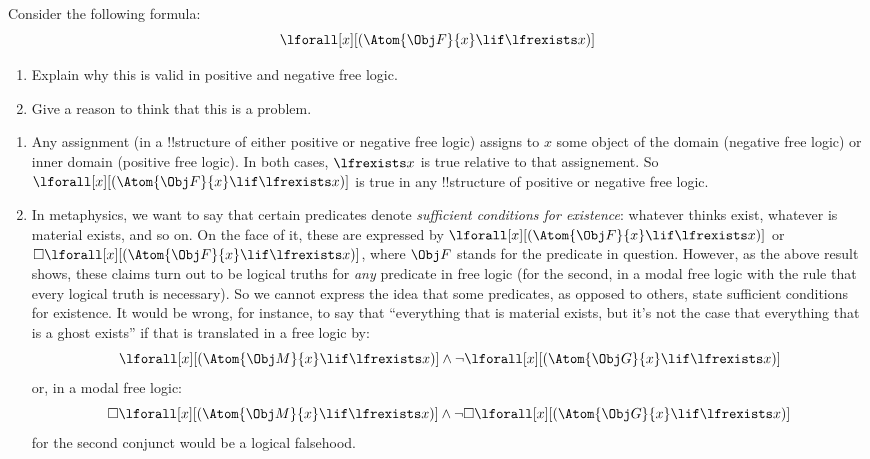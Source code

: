 \documentclass[../../../include/open-logic-section]{subfiles}
\begin{document}
\begin{prob}
Consider the following formula:
$$\lforall[x][(\Atom{\Obj F}{x} \lif \lfrexists x)]$$
\begin{enumerate}
	\item Explain why this is valid in positive and negative free logic.
	\item Give a reason to think that this is a problem.
\end{enumerate}
\begin{ans}
\begin{enumerate}
\item Any assignment (in a !!{structure} of either positive or
	negative free logic) assigns to $x$ some object of the domain
	(negative free logic) or inner domain (positive free logic). In
	both cases, $\lfrexists x$ is true relative to that assignement.
	So $\lforall[x][(\Atom{\Obj F}{x} \lif \lfrexists x)]$ is true in
	any !!{structure} of positive or negative free logic.
\item In metaphysics, we want to say that certain predicates denote
	\emph{sufficient conditions for existence}: whatever thinks exist,
	whatever is material exists, and so on. On the face of it, these
	are expressed by $\lforall[x][(\Atom{\Obj F}{x} \lif \lfrexists
	x)]$ or $\Box\lforall[x][(\Atom{\Obj F}{x} \lif \lfrexists x)]$,
	where $\Obj F$ stands for the predicate in question. However, as the
	above result shows, these claims turn out to be logical truths for
	\emph{any} predicate in free logic (for the second, in a modal
	free logic with the rule that every logical truth is necessary).
	So we cannot express the idea that some predicates, as opposed to
	others, state sufficient conditions for existence. It would be
	wrong, for instance, to say that ``everything that is material
	exists, but it's not the case that everything that is a ghost
	exists'' if that is translated in a free logic by:
	$$\lforall[x][(\Atom{\Obj M}{x} \lif \lfrexists x)] \land \lnot
    \lforall[x][(\Atom{\Obj G}{x} \lif \lfrexists x)]$$ or, in a modal
    free logic: $$\Box \lforall[x][(\Atom{\Obj M}{x} \lif \lfrexists
    x)] \land \lnot \Box \lforall[x][(\Atom{\Obj G}{x} \lif \lfrexists
    x)]$$ for the second conjunct would be a logical falsehood. 
\end{enumerate}
\end{ans}
\end{prob}
\end{document}
